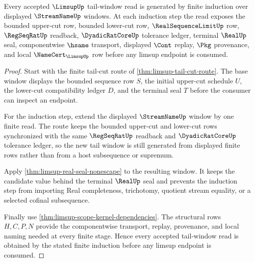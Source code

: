 \begin{theorem}
\label{thm:limsup-tail-window-induction-scope}
Every accepted $\LimsupUp$ tail-window read is generated by finite induction over displayed $\StreamNameUp$ windows. At each induction step the read exposes the bounded upper-cut row, bounded lower-cut row, $\RealSequenceLimitUp$ row, $\RegSeqRatUp$ readback, $\DyadicRatCoreUp$ tolerance ledger, terminal $\RealUp$ seal, componentwise $\hsame$ transport, displayed $\Cont$ replay, $\Pkg$ provenance, and local $\NameCert_{\LimsupUp}$ row before any limsup endpoint is consumed.
\end{theorem}
\begin{proof}
Start with the finite tail-cut route of \autoref{thm:limsup-tail-cut-route}. The base window displays the bounded sequence row $S$, the initial upper-cut schedule $U$, the lower-cut compatibility ledger $D$, and the terminal seal $T$ before the consumer can inspect an endpoint.

For the induction step, extend the displayed $\StreamNameUp$ window by one finite read. The route keeps the bounded upper-cut and lower-cut rows synchronized with the same $\RegSeqRatUp$ readback and $\DyadicRatCoreUp$ tolerance ledger, so the new tail window is still generated from displayed finite rows rather than from a host subsequence or supremum.

Apply \autoref{thm:limsup-real-seal-nonescape} to the resulting window. It keeps the candidate value behind the terminal $\RealUp$ seal and prevents the induction step from importing Real completeness, trichotomy, quotient stream equality, or a selected cofinal subsequence.

Finally use \autoref{thm:limsup-scope-kernel-dependencies}. The structural rows $H,C,P,N$ provide the componentwise transport, replay, provenance, and local naming needed at every finite stage. Hence every accepted tail-window read is obtained by the stated finite induction before any limsup endpoint is consumed.
\end{proof}


